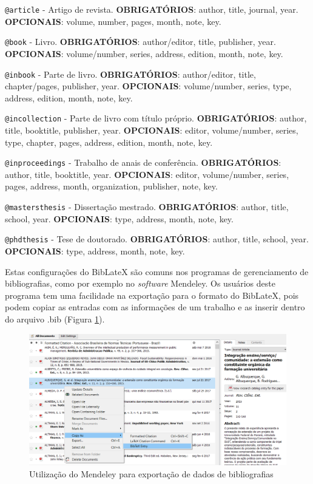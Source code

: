 \documentclass[12pt,brazil,oneside]{book}
\begin{document}
\texttt{@article} - Artigo de revista. \textbf{OBRIGATÓRIOS}: author, title, journal, year. \textbf{OPCIONAIS}: volume, number, pages, month, note, key.

\texttt{@book} - Livro. \textbf{OBRIGATÓRIOS}: author/editor, title, publisher, year.
\textbf{OPCIONAIS}: volume/number, series, address, edition, month, note, key.

\texttt{@inbook} - Parte de livro. \textbf{OBRIGATÓRIOS}: author/editor, title, chapter/pages, publisher, year. \textbf{OPCIONAIS}: volume/number, series, type, address, edition, month, note, key.

\texttt{@incollection} - Parte de livro com título próprio. \textbf{OBRIGATÓRIOS}: author, title, booktitle, publisher, year. \textbf{OPCIONAIS}: editor, volume/number, series, type, chapter, pages, address, edition, month, note, key.

\texttt{@inproceedings} - Trabalho de anais de conferência. \textbf{OBRIGATÓRIOS}: author, title, booktitle, year. \textbf{OPCIONAIS}: editor, volume/number, series, pages, address, month, organization, publisher, note, key.

\texttt{@mastersthesis} - Dissertação mestrado. \textbf{OBRIGATÓRIOS}: author, title, school, year. \textbf{OPCIONAIS}: type, address, month, note, key.

\texttt{@phdthesis} - Tese de doutorado. \textbf{OBRIGATÓRIOS}: author, title, school, year. \textbf{OPCIONAIS}: type, address, month, note, key.

Estas configurações do BibLateX são comuns nos programas de gerenciamento de bibliografias, como por exemplo no \emph{software} Mendeley. Os usuários deste programa tem uma facilidade na exportação para o formato do BibLateX, pois podem copiar as entradas com as informações de um trabalho e as inserir dentro do arquivo .bib (Figura \ref{fig:rmarkmendeley}).

\begin{figure}[H]

{\centering \includegraphics[width=0.8\linewidth]{rmarkmendeley} 

}

\caption{Utilização do Mendeley para exportação de dados de bibliografias}\label{fig:rmarkmendeley}
\end{figure}
\end{document}

